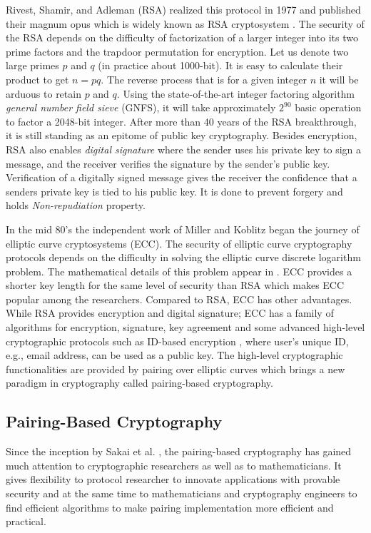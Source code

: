 Rivest, Shamir, and Adleman (RSA) realized this protocol in 1977 and published their magnum opus which is widely known as RSA cryptosystem \cite{rivest1978method}. 
The security of the RSA depends on the difficulty of factorization of a larger integer into its two prime factors and the trapdoor permutation for encryption.
Let us denote two large primes $p$ and $q$ (in practice about 1000-bit).
It is easy to calculate their product to get $n = pq$.
The reverse process that is for a given integer $n$ it will be arduous to retain $p$ and $q$.
Using the state-of-the-art integer factoring algorithm \textit{general number field sieve }(GNFS), it will take approximately $2^{90}$ basic operation to factor a 2048-bit integer.
After more than 40 years of the RSA breakthrough, it is still standing as an epitome of public key cryptography.
Besides encryption, RSA also enables \textit{digital signature }where the sender uses his private key to sign a message, and the receiver verifies the signature by the sender's public key. 
Verification of a digitally signed message gives the receiver the confidence that a senders private key is tied to his public key.
It is done to prevent forgery and holds \textit{Non-repudiation} property.

In the mid 80's the independent work of Miller \cite{C:Miller85} and Koblitz \cite{koblitz1987elliptic} began the journey of elliptic curve cryptosystems (ECC). 
The security of elliptic curve cryptography protocols depends on the difficulty in solving the elliptic curve discrete logarithm problem.
The mathematical details of this problem appear in . %
ECC provides a shorter key length for the same level of security than RSA which makes ECC  popular among the researchers. 
Compared to RSA, ECC has other advantages. 
While RSA provides encryption and digital signature; ECC has a family of algorithms for encryption, signature, key agreement and some advanced high-level cryptographic protocols such as ID-based encryption \cite{AC:BonLynSha01}, where user's unique ID, e.g., email address, can be used as a public key. 
The high-level cryptographic functionalities are provided by pairing over elliptic curves \cite{book_GPCMrabet2016} which brings a new paradigm in cryptography called pairing-based cryptography.

\subsection{Pairing-Based Cryptography}  
\label{ch1_subsec_pbc}
Since the inception by Sakai et al. \cite{sakai2000cryptosystems}, the pairing-based cryptography has gained much attention to cryptographic researchers as well as to mathematicians. It gives flexibility to protocol researcher to innovate applications with provable security and at the same time to mathematicians and cryptography engineers to find efficient algorithms to make pairing implementation more efficient and practical.

